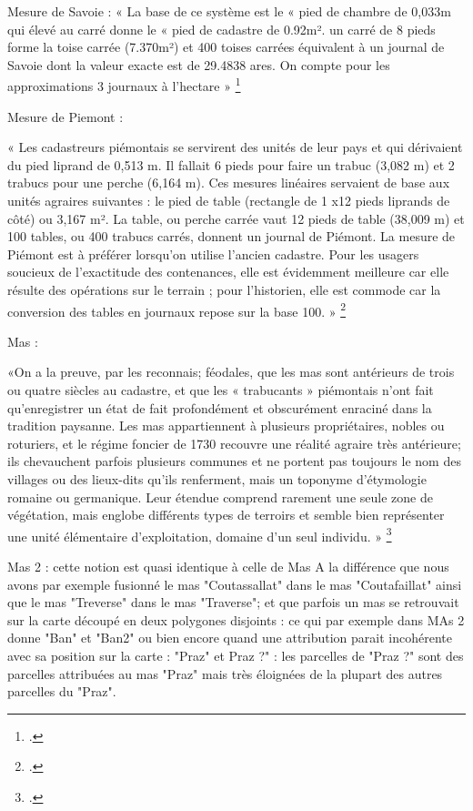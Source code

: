 \documentclass[12pt,a4paper]{report}
\begin{document}
Mesure de Savoie :
« La base de ce système est le « pied de chambre de 0,033m qui élevé au carré donne le « pied de cadastre de 0.92m². un carré de 8 pieds forme la toise carrée (7.370m²) et 400 toises carrées équivalent à un journal de Savoie dont la valeur exacte est de 29.4838 ares. On compte pour les approximations 3 journaux à l’hectare » 	\footcite[255--298]{GUICHONNET1955}


Mesure de Piemont :

« Les cadastreurs piémontais se servirent des unités de leur pays et qui dérivaient du pied liprand de 0,513 m. Il fallait 6 pieds pour faire un trabuc (3,082 m) et 2 trabucs pour une perche (6,164 m). Ces mesures linéaires servaient de base aux unités agraires suivantes : le pied de table (rectangle de 1 x12 pieds liprands de côté) ou 3,167 m². La table, ou perche carrée vaut 12 pieds de table (38,009 m) et 100 tables, ou 400 trabucs carrés, donnent un journal de Piémont. La mesure de Piémont est à préférer lorsqu’on utilise l’ancien cadastre. Pour les usagers soucieux de l’exactitude des contenances, elle est évidemment meilleure car elle résulte des opérations sur le terrain ; pour l’historien, elle est commode car la conversion des tables en journaux repose sur la base 100. » \footcite{GUICHONNET1955}


Mas :

«On a la preuve, par les reconnais; féodales, que les mas sont antérieurs de trois ou quatre siècles au cadastre, et que les « trabucants » piémontais n’ont fait qu’enregistrer un état de fait profondément et obscurément enraciné dans la tradition paysanne. Les mas appartiennent à plusieurs propriétaires, nobles ou roturiers, et le régime foncier de 1730 recouvre une réalité agraire très antérieure; ils chevauchent parfois plusieurs communes et ne portent pas toujours le nom des villages ou des lieux-dits qu’ils renferment, mais un toponyme d’étymologie romaine ou germanique. Leur étendue comprend rarement une seule zone de végétation, mais englobe différents types de terroirs et semble bien représenter une unité élémentaire d'exploitation, domaine d’un seul individu. » \footcite{GUICHONNET1955}

Mas 2 : cette notion est quasi identique à celle de Mas
A la différence que nous avons par exemple fusionné le mas "Coutassallat" dans le mas "Coutafaillat" ainsi que le mas "Treverse" dans le mas "Traverse"; et que parfois un mas se retrouvait sur la carte découpé en deux polygones disjoints : ce qui par exemple dans MAs 2 donne "Ban" et "Ban2" ou bien encore quand une attribution parait incohérente avec sa position sur la carte : "Praz" et Praz ?" : les parcelles de "Praz ?" sont des parcelles attribuées au mas "Praz" mais très éloignées de la plupart des autres parcelles du "Praz".
\end{document}
